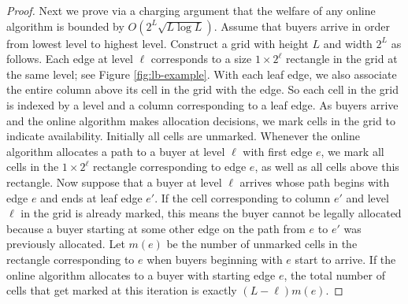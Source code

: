 \begin{proof}

  Next we prove via a charging argument that the welfare of any online
  algorithm is bounded by $O(2^L\sqrt{L\log L})$. Assume that 
  buyers arrive in order from lowest level to highest level.
  Construct a grid with height $L$ and width $2^L$ as follows. Each
  edge at level $\ell$ corresponds to a size $1\times 2^\ell$
  rectangle in the grid at the same level; see Figure
  \ref{fig:lb-example}. With each leaf edge, we also associate the
  entire column above its cell in the grid with the edge. So each cell
  in the grid is indexed by a level and a column corresponding to a
  leaf edge. As buyers arrive and the online algorithm makes
  allocation decisions, we mark cells in the grid to indicate
  availability. Initially all cells are unmarked. Whenever the online
  algorithm allocates a path to a buyer at level $\ell$ with first
  edge $e$, we mark all cells in the $1\times 2^\ell$ rectangle
  corresponding to edge $e$, as well as all cells above this
  rectangle. Now suppose that a buyer at level $\ell$ arrives whose
  path begins with edge $e$ and ends at leaf edge $e'$. If the cell
  corresponding to column $e'$ and level $\ell$ in the grid is already
  marked, this means the buyer cannot be legally allocated because
  a buyer starting at some other edge on the path from $e$ to $e'$ was
  previously allocated. Let $m(e)$ be the number of unmarked cells 
  in the rectangle corresponding to $e$ when buyers beginning with $e$
  start to arrive.
  If the online algorithm allocates to a buyer
  with starting edge $e$, the total number of cells that get marked at
  this iteration is exactly $(L-\ell)m(e)$.


\end{proof}
